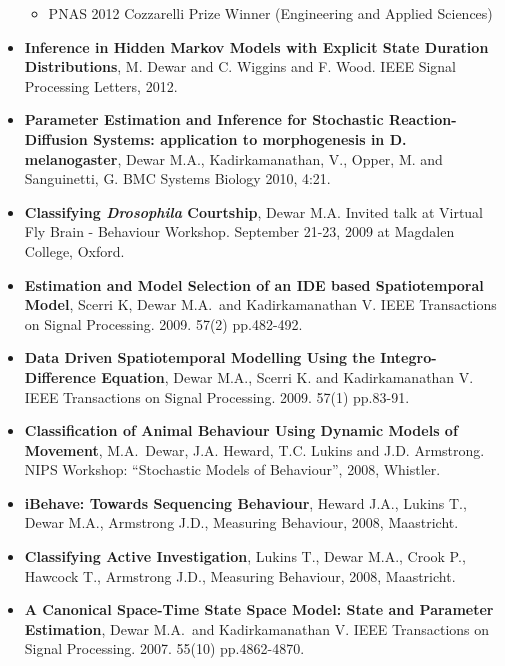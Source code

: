 \documentclass[line, overlapped]{res}
\begin{document}
\begin{resume}
\begin{itemize}
  \begin{itemize}
  \item
    PNAS 2012 Cozzarelli Prize Winner (Engineering and Applied Sciences)
  \end{itemize}
\item
  \textbf{Inference in Hidden Markov Models with Explicit State Duration
  Distributions}, M. Dewar and C. Wiggins and F. Wood. IEEE Signal
  Processing Letters, 2012.
\item
  \textbf{Parameter Estimation and Inference for Stochastic
  Reaction-Diffusion Systems: application to morphogenesis in D.
  melanogaster}, Dewar M.A., Kadirkamanathan, V., Opper, M. and
  Sanguinetti, G. BMC Systems Biology 2010, 4:21.
\item
  \textbf{Classifying \emph{Drosophila} Courtship}, Dewar M.A. Invited
  talk at Virtual Fly Brain - Behaviour Workshop. September 21-23, 2009
  at Magdalen College, Oxford.
\item
  \textbf{Estimation and Model Selection of an IDE based Spatiotemporal
  Model}, Scerri K, Dewar M.A.~and Kadirkamanathan V. IEEE Transactions
  on Signal Processing. 2009. 57(2) pp.482-492.
\item
  \textbf{Data Driven Spatiotemporal Modelling Using the
  Integro-Difference Equation}, Dewar M.A., Scerri K. and
  Kadirkamanathan V. IEEE Transactions on Signal Processing. 2009. 57(1)
  pp.83-91.
\item
  \textbf{Classification of Animal Behaviour Using Dynamic Models of
  Movement}, M.A.~Dewar, J.A. Heward, T.C. Lukins and J.D. Armstrong.
  NIPS Workshop: ``Stochastic Models of Behaviour'', 2008, Whistler.
\item
  \textbf{iBehave: Towards Sequencing Behaviour}, Heward J.A., Lukins
  T., Dewar M.A., Armstrong J.D., Measuring Behaviour, 2008, Maastricht.
\item
  \textbf{Classifying Active Investigation}, Lukins T., Dewar M.A.,
  Crook P., Hawcock T., Armstrong J.D., Measuring Behaviour, 2008,
  Maastricht.
\item
  \textbf{A Canonical Space-Time State Space Model: State and Parameter
  Estimation}, Dewar M.A.~and Kadirkamanathan V. IEEE Transactions on
  Signal Processing. 2007. 55(10) pp.4862-4870.
\end{itemize}

\end{resume}
\end{document}
